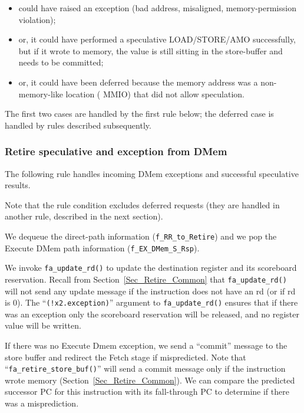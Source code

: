 \begin{itemize}
 \item could have raised an exception (bad address,
       misaligned, memory-permission violation);
 \item or, it could have performed
       a speculative LOAD/STORE/AMO successfully, but if it wrote to memory,
       the value is still sitting in the store-buffer and needs to be
       committed;
 \item or, it could have been deferred because the memory address
       was a non-memory-like location ({\eg} MMIO) that did not allow
       speculation.
\end{itemize}

The first two cases are handled by the first rule below; the deferred
case is handled by rules described subsequently.


\subsubsection{Retire speculative and exception from DMem}

\label{Sec_Fife_Retire_DMem}

The following rule handles incoming DMem exceptions and successful
speculative results.



Note that the rule condition excludes deferred requests (they are
handled in another rule, described in the next section).

We dequeue the direct-path information (\verb|f_RR_to_Retire|) and we
pop the Execute DMem path information (\verb|f_EX_DMem_S_Rsp|).

We invoke \verb|fa_update_rd()| to update the destination register and
its scoreboard reservation.  Recall from
Section~\ref{Sec_Retire_Common} that \verb|fa_update_rd()| will not
send any update message if the instruction does not have an rd (or if
rd is 0).  The ``\verb|(!x2.exception)|'' argument to
\verb|fa_update_rd()| ensures that if there was an exception only the
scoreboard reservation will be released, and no register value will be
written.

If there was no Execute Dmem exception, we send a ``commit'' message
to the store buffer and redirect the Fetch stage if mispredicted.
Note that ``\verb|fa_retire_store_buf()|'' will send a commit message
only if the instruction wrote memory
(Section~\ref{Sec_Retire_Common}).  We can compare the predicted
successor PC for this instruction with its fall-through PC to
determine if there was a misprediction.

